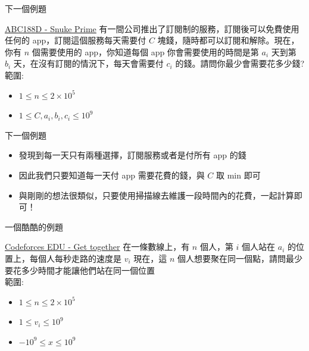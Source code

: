 \documentclass[aspectratio=169]{beamer}
\begin{document}
    \begin{frame}{下一個例題}
        \begin{block}{\href{https://atcoder.jp/contests/abc188/tasks/abc188_d}{ABC188D - Snuke Prime}}
            有一間公司推出了訂閱制的服務，訂閱後可以免費使用任何的 app，訂閱這個服務每天需要付 $C$ 塊錢，隨時都可以訂閱和解除。現在，你有 $n$ 個需要使用的 app，你知道每個 app 你會需要使用的時間是第 $a_i$ 天到第 $b_i$ 天，在沒有訂閱的情況下，每天會需要付 $c_i$ 的錢。請問你最少會需要花多少錢? \\
            \vspace{5mm}
            範圍:
            \begin{itemize}
                \item $1 \le n \le 2 \times 10^5$
                \item $1 \le C,a_i,b_i,c_i \le 10^9$
            \end{itemize}
        \end{block}
    \end{frame}
    
    \begin{frame}{下一個例題}
        \begin{itemize}
            \item 發現到每一天只有兩種選擇，訂閱服務或者是付所有 app 的錢
            \item<2-> 因此我們只要知道每一天付 app 需要花費的錢，與 $C$ 取 min 即可
            \item<3-> 與剛剛的想法很類似，只要使用掃描線去維護一段時間內的花費，一起計算即可！
        \end{itemize}
    \end{frame}
    
    \begin{frame}{一個酷酷的例題}
        \begin{block}{\href{https://codeforces.com/edu/course/2/lesson/6/3/practice/contest/285083/problem/A}{Codeforces EDU - Get together}}
            在一條數線上，有 $n$ 個人，第 $i$ 個人站在 $a_i$ 的位置上，每個人每秒走路的速度是 $v_i$ 現在，這 $n$ 個人想要聚在同一個點，請問最少要花多少時間才能讓他們站在同一個位置 \\
            \vspace{5mm}
            範圍:
            \begin{itemize}
                \item $1 \le n \le 2 \times 10^5$
                \item $1 \le v_i \le 10^9$
                \item $-10^9 \le x \le 10^9$
            \end{itemize}
        \end{block}
    \end{frame}
    
\end{document}
